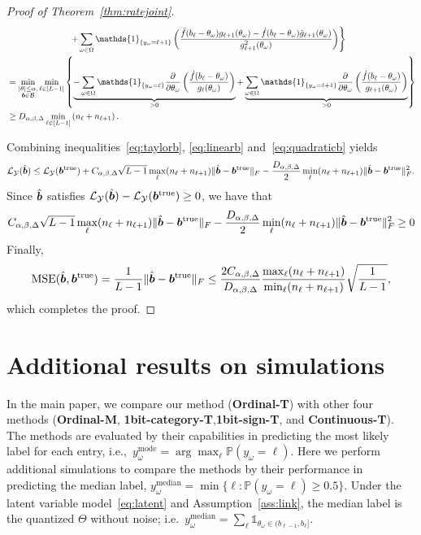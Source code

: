 \documentclass[11pt]{article}
\theoremstyle{plain}
\theoremstyle{definition}
\newcommand*{\KeepStyleUnderBrace}[1]{%
  \mathop{%
    \mathchoice
    {\underbrace{\displaystyle#1}}%
    {\underbrace{\textstyle#1}}%
    {\underbrace{\scriptstyle#1}}%
    {\underbrace{\scriptscriptstyle#1}}%
  }\limits
}
\begin{document}
\begin{proof}[Proof of Theorem~\ref{thm:ratejoint}]
\begin{align}
&\left. \hspace{1in}+\sum_{\omega\in\Omega}\mathds{1}_{\{y_\omega=\ell+1\}} \left( {\ddot{f}(b_\ell-\theta_\omega) g_{\ell+1}(\theta_\omega) - \dot{f}(b_\ell-\theta_\omega)\dot{g}_{\ell+1} (\theta_\omega)\over g^2_{\ell+1}(\theta_\omega)} \right)\right\}\\
&=\min_{\substack{|\theta|\leq \alpha,\\ \mb\in\tB}} \min_{\ell\in[L-1]}\left\{\KeepStyleUnderBrace{-\sum_{\omega\in\Omega} \mathds{1}_{\{y_\omega=\ell\}}{\partial \over \partial \theta_\omega}\left( \dot{f}(b_\ell-\theta_\omega) \over g_\ell(\theta_\omega) \right)}_{>0}+\KeepStyleUnderBrace{\sum_{\omega\in\Omega}\mathds{1}_{\{y_\omega=\ell+1\}} {\partial \over \partial \theta_\omega}\left( \dot{f}(b_\ell-\theta_\omega) \over g_{\ell+1}(\theta_\omega) \right) }_{>0}\right\}\\
&\geq D_{\alpha,\beta,\Delta}  \min_{\ell\in[L-1]}\left(n_{\ell}+n_{\ell+1}\right) .
\end{align}

Combining inequalities~\eqref{eq:taylorb}, \eqref{eq:linearb} and~\eqref{eq:quadraticb} yields
\[
\mathcal{L}_{\mathcal{Y}}(\hat {\bm{b}})\leq \mathcal{L}_{\mathcal{Y}}(\bm{b}^{\mathrm{true}})+C_{\alpha,\beta,\Delta}\sqrt{L-1}\max_{\ell}(n_\ell+n_{\ell+1}) \lVert\hat{\bm{b}}-\bm{b}^{\mathrm{true}}\rVert_F -\frac{D_{\alpha,\beta,\Delta}}{2}\min_{\ell}(n_\ell+n_{\ell+1}) \lVert\hat{\bm{b}}-\bm{b}^{\mathrm{true}}\rVert_F^2 .
\]
Since $\hat {\bm{b}}$ satisfies $\mathcal{L}_{\mathcal{Y}}(\hat {\bm{b}})-\mathcal{L}_{\mathcal{Y}}(\bm{b}^{\mathrm{true}})\geq 0$, we have that
\[
C_{\alpha,\beta,\Delta}\sqrt{L-1}\max_{\ell}(n_\ell+n_{\ell+1}) \lVert\hat{\bm{b}}-\bm{b}^{\mathrm{true}}\rVert_F -\frac{D_{\alpha,\beta,\Delta}}{2}\min_{\ell}(n_\ell+n_{\ell+1}) \lVert\hat{\bm{b}}-\bm{b}^{\mathrm{true}}\rVert_F^2\geq 0
\]
Finally,
\[
\text{MSE}(\hat {\bm{b}},\bm{b}^{\mathrm{true}})={1\over L-1}\lVert\hat{\bm{b}}-\bm{b}^{\mathrm{true}}\rVert_F\leq {2C_{\alpha,\beta,\Delta} \over D_{\alpha,\beta,\Delta}}{\max_{\ell}(n_\ell+n_{\ell+1})\over \min_{\ell}(n_{\ell}+n_{\ell+1})}  \sqrt{1\over L-1},
\]
which completes the proof.
\end{proof}

\section{Additional results on simulations}
In the main paper, we compare our method ({\bf Ordinal-T}) with other four methods ({\bf Ordinal-M}, {\bf 1bit-category-T},{\bf 1bit-sign-T}, and {\bf Continuous-T}). The methods are evaluated by their capabilities in predicting the most likely label for each entry, i.e.,\ $y_\omega^{\text{mode}}=\arg\max_\ell\mathbb{P}(y_\omega=\ell)$. Here we perform additional simulations to compare the methods by their performance in predicting the median label, $y_\omega^{\text{median}}=\min\{\ell\colon\mathbb{P}(y_\omega=\ell)\geq 0.5\}$. Under the latent variable model~\eqref{eq:latent} and Assumption~\ref{ass:link}, the median label is the quantized $\Theta$ without noise; i.e.\ $y_\omega^{\text{median}}=\sum_\ell \mathds{1}_{\theta_\omega\in(b_{\ell-1},b_\ell]}$.
\end{document}
